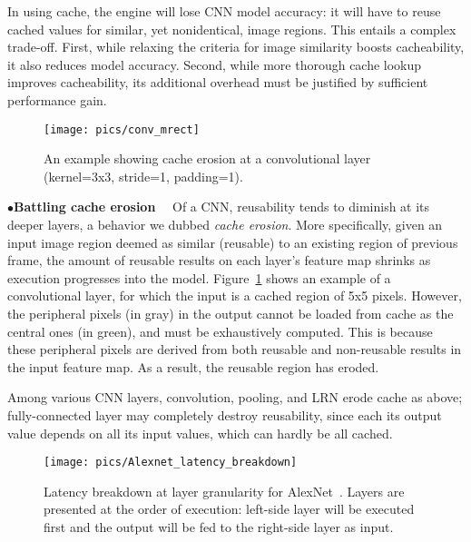 \documentclass[10pt,acmtog]{acmart}
\newcommand{\framework}{DeepCache\xspace}
\newcommand{\mengwei}[1]{{\color{red}{#1}}}
\begin{document}
In using cache, the engine will lose CNN model accuracy: it will have to reuse cached values for similar, yet nonidentical, image regions. 
This entails a complex trade-off. 
First, while relaxing the criteria for image similarity boosts cacheability, it also reduces model accuracy.
Second, while more thorough cache lookup improves cacheability, its additional overhead must be justified by sufficient performance gain. 

\begin{figure}[t]
	\centering
	\texttt{[image: pics/conv\_mrect]}
	\caption{An example showing cache erosion at a convolutional layer (kernel=3x3, stride=1, padding=1).}
	\label{fig:conv_mrect}
\end{figure}\noindent$\bullet$\textbf{Battling cache erosion}~~
Of a CNN, reusability tends to diminish at its deeper layers, a behavior we dubbed \textit{cache erosion}. 
More specifically, given an input image region deemed as similar (reusable) to an existing region of previous frame, the amount of reusable results on each layer's feature map shrinks as execution progresses into the model.
Figure~\ref{fig:conv_mrect} shows an example of a convolutional layer, for which the input is a cached region of 5x5 pixels.
However, the peripheral pixels (in gray) in the output cannot be loaded from cache as the central ones (in green), and must be exhaustively computed. 
This is because these peripheral pixels are derived from both reusable and non-reusable results in the input feature map. 
As a result, the reusable region has eroded.

Among various CNN layers, convolution, pooling, and LRN erode cache as above; 
fully-connected layer may completely destroy reusability, since each its output value depends on all its input values, which can hardly be all cached. 
\begin{figure}[t]
	\centering
	\texttt{[image: pics/Alexnet\_latency\_breakdown]}
	\caption{Latency breakdown at layer granularity for AlexNet~\cite{alexnet}. Layers are presented at the order of execution: left-side layer will be executed first and the output will be fed to the right-side layer as input.}
	\label{fig:alexnet}
\end{figure}
\end{document}
